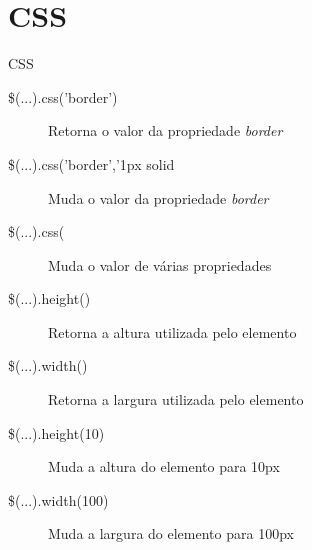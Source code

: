\section{CSS}
\begin{frame}{CSS}
\begin{description}
	\item[\$(...).css('border')] Retorna o valor da propriedade \textit{border}
	\pause\item[\$(...).css('border','1px solid #000')] Muda o valor da propriedade \textit{border}
	\pause\item[\$(...).css({width: '16px', height: '16px')] Muda o valor de várias propriedades
	\pause\item[\$(...).height()] Retorna a altura utilizada pelo elemento
	\pause\item[\$(...).width()] Retorna a largura utilizada pelo elemento
	\pause\item[\$(...).height(10)] Muda a altura do elemento para 10px
	\pause\item[\$(...).width(100)] Muda a largura do elemento para 100px
\end{description}
\end{frame}

